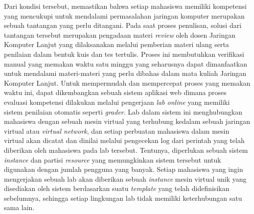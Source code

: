 Dari kondisi tersebut, memastikan bahwa setiap mahasiswa memiliki kompetensi yang mencukupi untuk mendalami permasalahan jaringan komputer 
merupakan sebuah tantangan yang perlu ditangani. Pada saat proses penulisan, solusi dari tantangan tersebut merupakan pengadaan materi
\textit{review} oleh dosen Jaringan Komputer Lanjut yang dilaksanakan melalui pemberian materi ulang serta penilaian dalam bentuk kuis dan tes tertulis.
Proses ini membutuhkan verifikasi manual yang memakan waktu satu minggu yang seharusnya dapat dimanfaatkan untuk mendalami materi-materi yang perlu dibahas
dalam mata kuliah Jaringan Komputer Lanjut. Untuk mempermudah dan mempercepat proses yang memakan waktu ini, dapat dikembangkan sebuah 
sistem aplikasi web dimana proses evaluasi kompetensi dilakukan melalui pengerjaan \textit{lab online} yang memiliki sistem penilaian otomatis seperti \textit{grader}.
Lab dalam sistem ini menghubungkan mahasiswa dengan sebuah mesin virtual yang terhubung kedalam sebuah jaringan 
virtual atau \textit{virtual network}, dan setiap perbuatan mahasiswa dalam mesin virtual akan dicatat dan dinilai melalui pengecekan log dari perintah yang telah diberikan
oleh mahasiswa pada lab tersebut. 
Tentunya, diperlukan sebuah sistem \textit{instance} dan partisi \textit{resource} yang memungkinkan sistem tersebut untuk digunakan dengan jumlah pengguna yang banyak.
Setiap mahasiswa yang ingin mengerjakan sebuah lab akan diberikan sebuah \textit{instance} mesin virtual unik yang disediakan oleh sistem berdasarkan suatu \textit{template} yang telah didefinisikan sebelumnya, 
sehingga setiap lingkungan lab tidak memiliki keterhubungan satu sama lain.
\par


